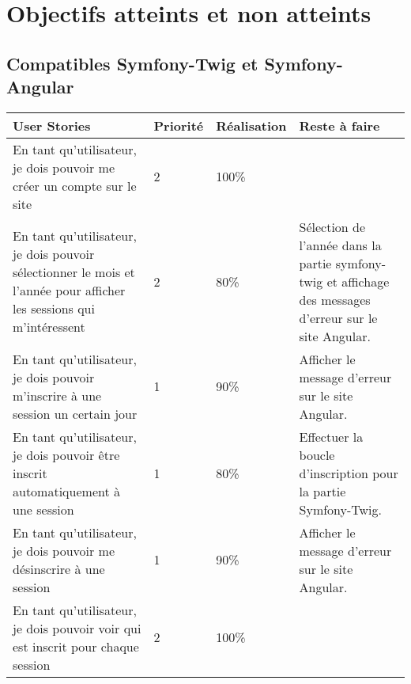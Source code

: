\section{Objectifs atteints et non atteints}
	\subsection{Compatibles Symfony-Twig et Symfony-Angular}
		\begin{center}
			\begin{tabularx}{\textwidth}{|Y|T{0.1\textwidth}|T{0.15\textwidth}|Y|}
				\hline
				User Stories & Priorité & Réalisation & Reste à faire \\
				\hline	
				En tant qu’utilisateur, je dois pouvoir me créer un compte sur le site & 2 & 100\% & \\
				\hline
				En tant qu'utilisateur, je dois pouvoir sélectionner le mois et l'année pour afficher les sessions qui m'intéressent & 2 & 80\% & Sélection de l'année dans la partie symfony-twig et affichage des messages d'erreur sur le site Angular. \\
				\hline
				En tant qu’utilisateur, je dois pouvoir m’inscrire à une session un certain jour & 1 & 90\% & Afficher le message d'erreur sur le site Angular.\\
				\hline
				En tant qu’utilisateur, je dois pouvoir être inscrit automatiquement à une session & 1 & 80\% & Effectuer la boucle d'inscription pour la partie Symfony-Twig.  \\
				\hline
				En tant qu’utilisateur, je dois pouvoir me désinscrire à une session & 1 & 90\% & Afficher le message d'erreur sur le site Angular.\\
				\hline
				En tant qu’utilisateur, je dois pouvoir voir qui est inscrit pour chaque session & 2 & 100\% & \\
				\hline
			\end{tabularx}
		\end{center}
	
